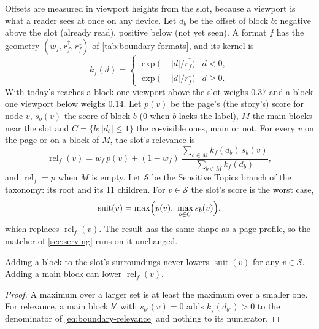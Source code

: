 Offsets are measured in viewport heights from the slot, because a viewport is
what a reader sees at once on any device. Let $d_b$ be the offset of block $b$:
negative above the slot (already read), positive below (not yet seen). A
format $f$ has the geometry $(w_f, r^{\uparrow}_f, r^{\downarrow}_f)$ of
\cref{tab:boundary-formats}, and its kernel is
\begin{equation}\label{eq:boundary-kernel}
k_f(d) =
\begin{cases}
  \exp\bigl(-|d| / r^{\uparrow}_f\bigr) & d < 0,\\
  \exp\bigl(-|d| / r^{\downarrow}_f\bigr) & d \ge 0.
\end{cases}
\end{equation}
With today's reaches a block one viewport above the slot weighs $0.37$ and a
block one viewport below weighs $0.14$. Let $p(v)$ be the page's (the story's)
score for node $v$, $s_b(v)$ the score of block $b$ ($0$ when $b$ lacks the
label), $M$ the main blocks near the slot and $C = \{b : |d_b| \le 1\}$ the
co-visible ones, main or not. For every $v$ on the page or on a block of $M$,
the slot's relevance is
\begin{equation}\label{eq:boundary-relevance}
\operatorname{rel}_f(v) = w_f\, p(v) + (1 - w_f)\,
  \frac{\sum_{b \in M} k_f(d_b)\, s_b(v)}{\sum_{b \in M} k_f(d_b)},
\end{equation}
and $\operatorname{rel}_f = p$ when $M$ is empty. Let $\mathcal{S}$ be the
Sensitive Topics branch of the taxonomy: its root and its 11 children. For
$v \in \mathcal{S}$ the slot's score is the worst case,
\begin{equation}\label{eq:boundary-suitability}
\operatorname{suit}(v) = \max\Bigl(p(v),\ \max_{b \in C} s_b(v)\Bigr),
\end{equation}
which replaces $\operatorname{rel}_f(v)$. The result has the same shape as a
page profile, so the matcher of \cref{sec:serving} runs on it unchanged.

\begin{proposition}\label{prop:boundary-monotone}
Adding a block to the slot's surroundings never lowers $\operatorname{suit}(v)$
for any $v \in \mathcal{S}$. Adding a main block can lower
$\operatorname{rel}_f(v)$.
\end{proposition}
\begin{proof}
A maximum over a larger set is at least the maximum over a smaller one. For
relevance, a main block $b'$ with $s_{b'}(v) = 0$ adds $k_f(d_{b'}) > 0$ to the
denominator of \cref{eq:boundary-relevance} and nothing to its numerator.
\end{proof}

